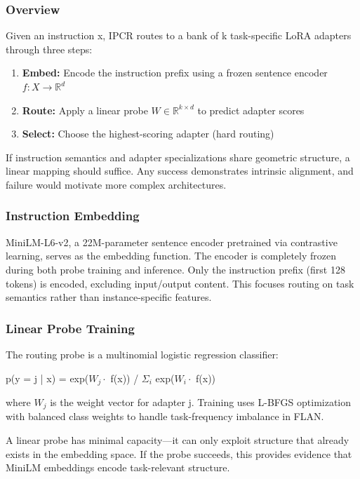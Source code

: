 
\subsubsection{Overview}

Given an instruction x, IPCR routes to a bank of k task-specific LoRA adapters through three steps:

\begin{enumerate}
\item \textbf{Embed:} Encode the instruction prefix using a frozen sentence encoder $f: X \rightarrow \mathbb{R}^d$
\item \textbf{Route:} Apply a linear probe $W \in \mathbb{R}^{k\times d}$ to predict adapter scores
\item \textbf{Select:} Choose the highest-scoring adapter (hard routing)
\end{enumerate}

If instruction semantics and adapter specializations share geometric structure, a linear mapping should suffice. Any success demonstrates intrinsic alignment, and failure would motivate more complex architectures.

\subsubsection{Instruction Embedding}

MiniLM-L6-v2, a 22M-parameter sentence encoder pretrained via contrastive learning, serves as the embedding function. The encoder is completely frozen during both probe training and inference. Only the instruction prefix (first 128 tokens) is encoded, excluding input/output content. This focuses routing on task semantics rather than instance-specific features.

\subsubsection{Linear Probe Training}

The routing probe is a multinomial logistic regression classifier:

p(y = j | x) = exp($W_j \cdot$ f(x)) / $\Sigma _i$ exp($W_i \cdot$ f(x))

where $W_j$ is the weight vector for adapter j. Training uses L-BFGS optimization with balanced class weights to handle task-frequency imbalance in FLAN.

A linear probe has minimal capacity---it can only exploit structure that already exists in the embedding space. If the probe succeeds, this provides evidence that MiniLM embeddings encode task-relevant structure.

